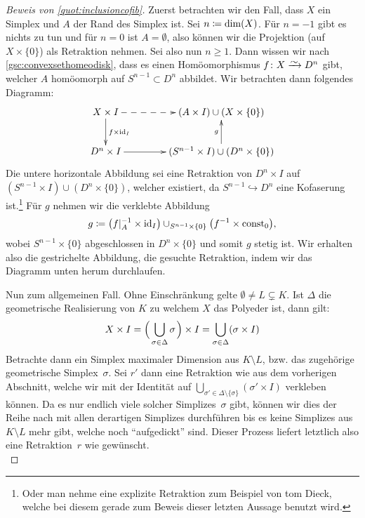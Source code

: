 \begin{proof}[Beweis von \cref{quot:inclusioncofib}]
    \pagebreak[2]
    Zuerst betrachten wir den Fall, dass $X$ ein Simplex und $A$ der Rand
    des Simplex ist. Sei $n\coloneqq\dim(X)$. Für $n=-1$ gibt es nichts zu tun und
    für $n=0$ ist $A=\emptyset$, also können wir die Projektion (auf
    $X\times\{0\}$) als Retraktion nehmen. Sei also nun $n\geq1$.
    Dann wissen wir nach \cref{gsc:convexsethomeodisk}, dass es
    einen Homöomorphismus 
    $f\colon X\xrightarrow{\smash{\raisebox{-2pt}{$\sim$}}} D^n$ 
    gibt, welcher $A$ homöomorph auf $S^{n-1}\subset D^n$ abbildet.
    Wir betrachten dann folgendes Diagramm:
    \begin{equation*}
        \begin{xy}
            \xymatrix@C=1.5cm{
                X\times I \ar@{-->}[r] \ar[d]^{f\times\id_I}
                & (A\times I)\cup(X\times\{0\})    
                \\
                D^n\times I \ar[r] 
                & (S^{n-1}\times I)\cup(D^n\times\{0\}) \ar[u]^g
            }
        \end{xy}
    \end{equation*}
    Die untere horizontale Abbildung sei eine Retraktion von $D^n\times I$ auf
    $(S^{n-1}\times I)\cup(D^n\times\{0\})$, welcher existiert, da
    $S^{n-1}\hookrightarrow D^n$ eine Kofaserung ist.\footnote{%
        Oder man nehme eine explizite Retraktion zum Beispiel von
        tom Dieck\cite[Ch.\,2,.5]{bookc:tomdieck08}, welche bei diesem
        gerade zum Beweis dieser letzten Aussage benutzt wird.%
    }
    Für $g$ nehmen wir die
    verklebte Abbildung 
    \[ g \coloneqq \bigl(f\vert_A^{-1} \times\operatorname{id}_I\bigr) \cup_{S^{n-1}\times\{0\}}
        \bigl( f^{-1}\times\operatorname{const}_0 \bigr)
    , \]
    wobei $S^{n-1}\times\{0\}$ abgeschlossen in $D^n\times\{0\}$ und somit $g$
    stetig ist. Wir erhalten also die gestrichelte Abbildung, die gesuchte
    Retraktion, indem wir das Diagramm unten herum durchlaufen.

    Nun zum allgemeinen Fall. Ohne Einschränkung gelte 
    $\emptyset\neq L \subsetneq K$. Ist $\Delta$ die geometrische Realisierung
    von $K$ zu welchem $X$ das Polyeder ist, dann gilt:
    \[ X \times I 
        = \Bigl(\, \bigcup_{\sigma\in\Delta} \sigma \mkern2mu\Bigr) \times I
        = \bigcup_{\sigma\in\Delta} (\sigma\times I)
    \]
    Betrachte dann ein Simplex maximaler Dimension aus $K\setminus L$, bzw. das
    zugehörige geometrische Simplex~$\sigma$. Sei $r'$ dann eine Retraktion wie
    aus dem vorherigen Abschnitt, welche wir mit der Identität auf
    $\bigcup_{\sigma'\in\Delta\setminus\{\sigma\}} (\sigma'\times I)$ verkleben
    können. Da es nur endlich viele solcher Simplizes~$\sigma$ gibt, können wir
    dies der Reihe nach mit allen derartigen Simplizes durchführen bis es keine
    Simplizes aus $K\setminus L$ mehr gibt, welche noch \enquote{aufgedickt}
    sind. Dieser Prozess liefert letztlich also eine Retraktion~$r$ wie
    gewünscht.
    \\
\end{proof}
